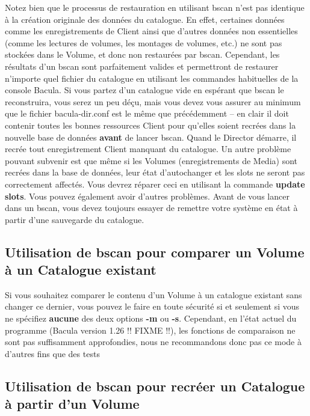 Notez bien que le processus de restauration en utilisant bscan n'est pas 
identique à la création originale des données du catalogue. En effet, certaines
données comme les enregistrements de Client ainsi que d'autres données non
essentielles (comme les lectures de volumes, les montages de volumes, etc.) ne
sont pas stockées dans le Volume, et donc non restaurées par bscan. 
Cependant, les résultats d'un bscan sont parfaitement valides et permettront de
restaurer n'importe quel fichier du catalogue en utilisant les commandes 
habituelles de la console Bacula. Si vous partez d'un catalogue vide en espérant
que bscan le reconstruira, vous serez un peu déçu, mais vous devez vous assurer
au minimum que le fichier bacula-dir.conf est le même que précédemment -- en 
clair il doit contenir toutes les bonnes ressources Client pour qu'elles soient
recrées dans la nouvelle base de données {\bf avant} de lancer bscan. Quand le 
Director démarre, il recrée tout enregistrement Client manquant du catalogue.
Un autre problème pouvant subvenir est que même si les Volumes (enregistrements
de Media) sont recrées dans la base de données, leur état d'autochanger et les
slots ne seront pas correctement affectés. Vous devrez réparer ceci en utilisant
la commande {\bf update slots}. Vous pouvez également avoir d'autres problèmes.
Avant de vous lancer dans un bscan, vous devez toujours essayer de remettre 
votre système en état à partir d'une sauvegarde du catalogue.

\subsection{Utilisation de bscan pour comparer un Volume à un Catalogue existant}

Si vous souhaitez comparer le contenu d'un Volume à un catalogue existant sans 
changer ce dernier, vous pouvez le faire en toute sécurité si et seulement si
vous ne spécifiez {\bf aucune} des deux options {\bf -m} ou {\bf -s}. 
Cependant, en l'état actuel du programme (Bacula version 1.26 !! FIXME !!), les
fonctions de comparaison ne sont pas suffisamment approfondies, nous ne 
recommandons donc pas ce mode à d'autres fins que des tests

\subsection{Utilisation de bscan pour recréer un Catalogue à partir d'un Volume}

